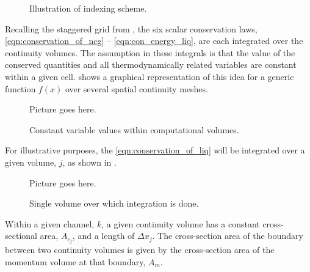 \begin{figure}[ht]
\caption{Illustration of indexing scheme.}
\label{fig:vertical_pipe_with_cells}
\begin{center}
\end{center}
\end{figure}

Recalling the staggered grid from , the six scalar conservation laws, \eqref{eqn:conservation_of_ncg} -- \eqref{eqn:con_energy_liq}, are each integrated over the continuity volumes.
The assumption in these integrals is that the value of the conserved quantities and all thermodynamically related variables are constant within a given cell.
 shows a graphical representation of this idea for a generic function $f(x)$ over several spatial continuity meshes.

\begin{figure}[ht]
\caption{Constant variable values within computational volumes.}
\label{fig:constant_value}
\begin{center}
Picture goes here.
\end{center}
\end{figure}

For illustrative purposes,  the \eqref{eqn:conservation_of_liq} will be integrated over a given volume, $j$, as shown in .

\begin{figure}[ht]
\caption{Single volume over which integration is done.}
\label{fig:single_volume}
\begin{center}
Picture goes here.
\end{center}
\end{figure}

Within a given channel, $k$, a given continuity volume has a constant cross-sectional area, $A_{c_{j}}$, and a length of $\Delta x_{j}$.
The cross-section area of the boundary between two continuity volumes is given by the cross-section area of the momentum volume at that boundary, $A_{m}$.


